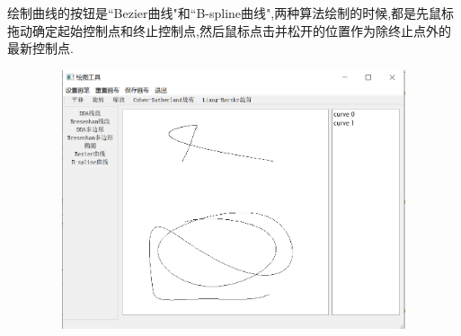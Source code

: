\documentclass[a4paper,UTF8]{article}
\theoremstyle{definition}
\begin{document}
绘制曲线的按钮是``Bezier曲线"和``B-spline曲线",两种算法绘制的时候,都是先鼠标拖动确定起始控制点和终止控制点,然后鼠标点击并松开的位置作为除终止点外的最新控制点.
\begin{figure}[H]
	\includegraphics[width=5in,height=3in]{curve.png}
\end{figure}
\end{document}
